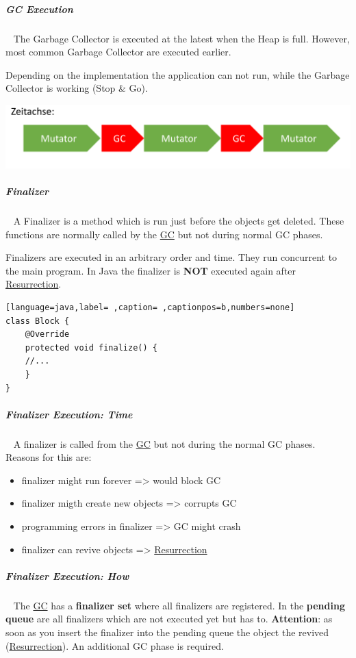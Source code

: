 \documentclass[11pt,twoside,landscape]{article}
\begin{document}
\begin{multicols}{3}
\subparagraph{GC Execution} \
\label{sec:org24b9909}
The Garbage Collector is executed at the latest when the Heap is full.
However, most common Garbage Collector are executed earlier.

Depending on the implementation the application can not run, while the Garbage Collector is working (Stop \& Go).


{
\begin{center}
\includegraphics[width=.9\linewidth]{img/stop_and_go_gc.png}
\end{center}
\label{fig:stop-go-gc}
}

\subparagraph{Finalizer} \
\label{sec:orga3e1d1a}
A Finalizer is a method which is run just before the objects get deleted.
These functions are normally called by the \href{../../../roam/20211008083744-garbage_collection.org}{GC} but not during normal GC phases.

Finalizers are executed in an arbitrary order and time.
They run concurrent to the main program.
In Java the finalizer is \textbf{NOT} executed again after \href{../../../roam/20221231095240-what_is_resurrection.org}{Resurrection}.

\begin{lstlisting}[language=java,label= ,caption= ,captionpos=b,numbers=none]
class Block {
    @Override
    protected void finalize() {
	//...
    }
}
\end{lstlisting}
\subparagraph{Finalizer Execution: Time} \
\label{sec:org707b2f7}
A finalizer is called from the \href{../../../roam/20211008083744-garbage_collection.org}{GC} but not during the normal GC phases. 
Reasons for this are:
\begin{itemize}
\item finalizer might run forever => would block GC
\item finalizer migth create new objects => corrupts GC
\item programming errors in finalizer => GC might crash
\item finalizer can revive objects => \href{../../../roam/20221231095240-what_is_resurrection.org}{Resurrection}
\end{itemize}
\subparagraph{Finalizer Execution: How} \
\label{sec:orgf4c6432}
The \href{../../../roam/20211008083744-garbage_collection.org}{GC} has a \textbf{finalizer set} where all finalizers are registered.
In the \textbf{pending queue} are all finalizers which are not executed yet but has to.
\textbf{Attention}: as soon as you insert the finalizer into the pending queue the object the revived (\href{../../../roam/20221231095240-what_is_resurrection.org}{Resurrection}).
An additional GC phase is required.



\end{multicols}
\end{document}
